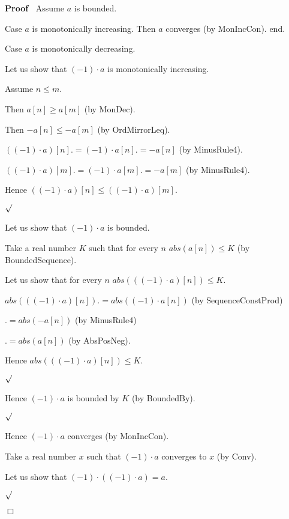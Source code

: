 \documentclass{article}
\newenvironment{forthel}{\begin{leftbar}}{\end{leftbar}}
\newenvironment{proof}{\noindent\textbf{Proof\ }}{\hspace*{\fill}$\Box$\medskip}
\newenvironment{subproof}{\begin{list}{}{}
		\item[\text{Proof}]}{\hfill $\surd$ \end{list}}
\newcommand{\cdottwo}{\cdot}
\begin{document}
\begin{forthel}
\begin{proof}
		Assume $a$ is bounded.
		
		Case $a$ is monotonically increasing. Then $a$ converges (by MonIncCon). 
		end.
		
		Case $a$ is monotonically decreasing.
		
		\begin{subproof}
			Let us show that $(-1) \cdottwo a$ is monotonically increasing.
			
			\begin{subproof}
				Assume $n \leq m$.
				
				Then $a[n] \geq a[m]$ (by MonDec).
				
				Then $-a[n] \leq -a[m]$ (by OrdMirrorLeq).
				
				$((-1) \cdottwo a)[n] .= (-1) \cdot a[n]
				.= -a[n]$ (by MinusRule4).
				
				$((-1) \cdottwo a)[m] .= (-1) \cdot a[m]
				.= -a[m]$ (by MinusRule4).
				
				Hence $((-1) \cdottwo a)[n] \leq ((-1) \cdottwo a)[m]$.
				
			\end{subproof}
			
			Let us show that $(-1) \cdottwo a$ is bounded.
			
			\begin{subproof}
				Take a real number $K$ such that for every $n$ $abs(a[n]) \leq K$ (by BoundedSequence).
				
				Let us show that for every $n$ $abs(((-1) \cdottwo a)[n]) \leq K$.
				
				\begin{subproof}
					$abs(((-1) \cdottwo a)[n]) .= abs((-1) \cdot a[n])$ (by SequenceConstProd)
					
					$.= abs(-a[n])$ (by MinusRule4)
					
					$.= abs(a[n])$ (by AbsPosNeg).
					
					Hence $abs(((-1) \cdottwo a)[n]) \leq K$.
					
				\end{subproof}
				
				Hence $(-1) \cdottwo a$ is bounded by $K$ (by BoundedBy).
				
			\end{subproof}
			
			Hence $(-1) \cdottwo a$ converges (by MonIncCon).
			
			Take a real number $x$ such that $(-1) \cdottwo a$ converges to $x$ (by Conv).
			
			Let us show that $(-1) \cdottwo ((-1) \cdottwo a) = a$.
			

\end{subproof}
\end{proof}
\end{forthel}
\end{document}
